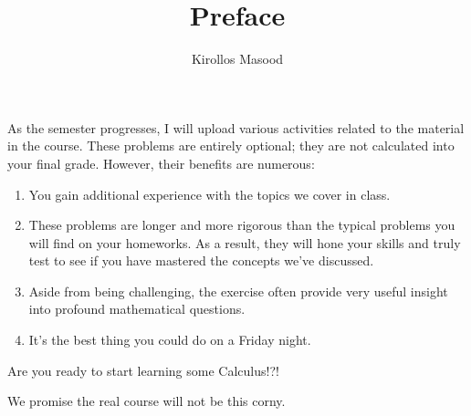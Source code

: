 \documentclass{ximera}
\title{Preface}
\author{Kirollos Masood}
\begin{document}
\begin{abstract}
\end{abstract}
\maketitle

\begin{sectionOutcomes}
	As the semester progresses, I will upload various activities related to the material in the course. These problems are entirely optional; they are not calculated into your final grade. However, their benefits are numerous:
	\begin{enumerate}
		
		\item
		You gain additional experience with the topics we cover in class.
		
		\item
		These problems are longer and more rigorous than the typical problems you will find on your homeworks. As a result, they will hone your skills and truly test to see if you have mastered the concepts we've discussed.
		
		\item
		Aside from being challenging, the exercise often provide very useful insight into profound mathematical questions.
		
		\item
		It's the best thing you could do on a Friday night.
		
	\end{enumerate}
	
\end{sectionOutcomes}

\begin{exercise}
	Are you ready to start learning some Calculus!?!
	\begin{multipleChoice}
	\end{multipleChoice}
	\begin{hint}
		We promise the real course will not be this corny.
	\end{hint}
\end{exercise}
\end{document}

